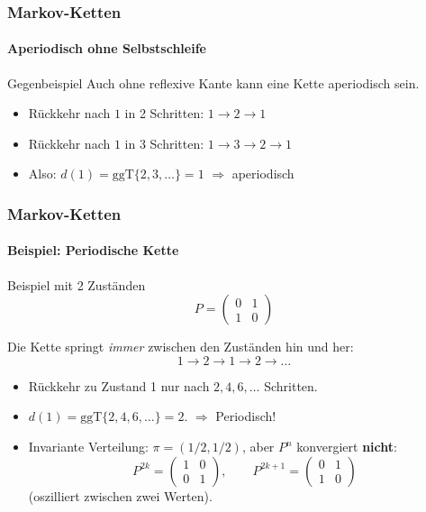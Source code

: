 \documentclass{beamer}
\begin{document}
\begin{frame}
    \frametitle{Markov-Ketten}
\framesubtitle{Aperiodisch ohne Selbstschleife}
    \begin{block}{Gegenbeispiel}
Auch ohne reflexive Kante kann eine Kette aperiodisch sein.
\end{block}
\begin{center}
\end{center}
\begin{itemize}
\item Rückkehr nach $1$ in 2 Schritten: $1 \to 2 \to 1$
\item Rückkehr nach $1$ in 3 Schritten: $1 \to 3 \to 2 \to 1$
\item Also: $d(1) = \mathrm{ggT}\{2,3,\ldots\} = 1$ \quad $\Rightarrow$ aperiodisch
\end{itemize}
 \end{frame}



\begin{frame}
    \frametitle{Markov-Ketten}
\framesubtitle{Beispiel: Periodische Kette}
    \begin{block}{Beispiel mit 2 Zuständen}
\[
P = \begin{pmatrix} 0 & 1 \\ 1 & 0 \end{pmatrix}
\]
\end{block}
Die Kette springt \emph{immer} zwischen den Zuständen hin und her:
\[
1 \to 2 \to 1 \to 2 \to \ldots
\]
\begin{itemize}
\item Rückkehr zu Zustand 1 nur nach $2, 4, 6, \ldots$ Schritten.
\item $d(1) = \mathrm{ggT}\{2, 4, 6, \ldots\} = 2$. \quad $\Rightarrow$ Periodisch!
\item Invariante Verteilung: $\pi = (1/2, 1/2)$, aber $P^n$ konvergiert \textbf{nicht}:
\[
P^{2k} = \begin{pmatrix} 1 & 0 \\ 0 & 1 \end{pmatrix}, \qquad
P^{2k+1} = \begin{pmatrix} 0 & 1 \\ 1 & 0 \end{pmatrix}
\]
(oszilliert zwischen zwei Werten).
\end{itemize}
 \end{frame}
\end{document}
